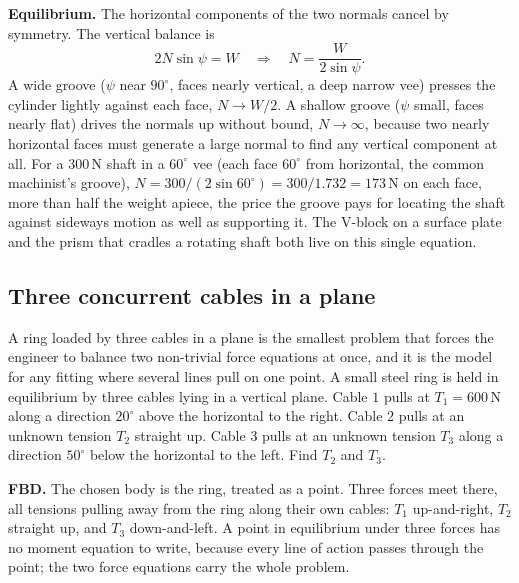 \textbf{Equilibrium.} The horizontal components of the two normals cancel by
symmetry. The vertical balance is
\[
2N\sin\psi = W \quad\Longrightarrow\quad N = \frac{W}{2\sin\psi}.
\]
A wide groove ($\psi$ near $90^{\circ}$, faces nearly vertical, a deep
narrow vee) presses the cylinder lightly against each face, $N \to W/2$. A
shallow groove ($\psi$ small, faces nearly flat) drives the normals up
without bound, $N \to \infty$, because two nearly horizontal faces must
generate a large normal to find any vertical component at all. For a
$300\,\text{N}$ shaft in a $60^{\circ}$ vee (each face $60^{\circ}$ from
horizontal, the common machinist's groove), $N = 300/(2\sin 60^{\circ}) =
300/1.732 = 173\,\text{N}$ on each face, more than half the weight apiece,
the price the groove pays for locating the shaft against sideways motion as
well as supporting it. The V-block on a surface plate and the prism that
cradles a rotating shaft both live on this single equation.

\subsection{Three concurrent cables in a plane}

A ring loaded by three cables in a plane is the smallest problem that
forces the engineer to balance two non-trivial force equations at once,
and it is the model for any fitting where several lines pull on one point.
A small steel ring is held in equilibrium by three cables lying in a
vertical plane. Cable $1$ pulls at $T_1 = 600\,\text{N}$ along a direction
$20^{\circ}$ above the horizontal to the right. Cable $2$ pulls at an
unknown tension $T_2$ straight up. Cable $3$ pulls at an unknown tension
$T_3$ along a direction $50^{\circ}$ below the horizontal to the left.
Find $T_2$ and $T_3$.

\textbf{FBD.} The chosen body is the ring, treated as a point. Three
forces meet there, all tensions pulling away from the ring along their
own cables: $T_1$ up-and-right, $T_2$ straight up, and $T_3$ down-and-left.
A point in equilibrium under three forces has no moment equation to write,
because every line of action passes through the point; the two force
equations carry the whole problem.


